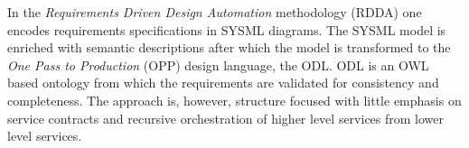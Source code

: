 In the {\em Requirements Driven Design Automation} methodology (RDDA) \cite{cardei_model_2008} one encodes requirements specifications in SYSML diagrams. The SYSML model is enriched with semantic descriptions after which the model is transformed to the {\em One Pass to Production} (OPP) design language, the ODL. ODL is an OWL based ontology from which the requirements are validated for consistency and completeness. The approach is, however, structure focused with little emphasis on service contracts and recursive orchestration of higher level services from lower level services.

